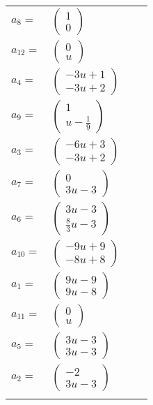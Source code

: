 \documentclass[1p]{elsarticle_modified}
\theoremstyle{definition}
\begin{document}
\begin{tabular}{m{7pt} m{180pt} m{7pt} m{180pt} }
\flushright $a_{8}=$&$\begin{pmatrix}1\\0\end{pmatrix}$ \\
\flushright $a_{12}=$&$\begin{pmatrix}0\\u\end{pmatrix}$ \\
\flushright $a_{4}=$&$\begin{pmatrix}-3 u+1\\-3 u+2\end{pmatrix}$ \\
\flushright $a_{9}=$&$\begin{pmatrix}1\\u-\frac{1}{9}\end{pmatrix}$ \\
\flushright $a_{3}=$&$\begin{pmatrix}-6 u+3\\-3 u+2\end{pmatrix}$ \\
\flushright $a_{7}=$&$\begin{pmatrix}0\\3 u-3\end{pmatrix}$ \\
\flushright $a_{6}=$&$\begin{pmatrix}3 u-3\\\frac{8}{3} u-3\end{pmatrix}$ \\
\flushright $a_{10}=$&$\begin{pmatrix}-9 u+9\\-8 u+8\end{pmatrix}$ \\
\flushright $a_{1}=$&$\begin{pmatrix}9 u-9\\9 u-8\end{pmatrix}$ \\
\flushright $a_{11}=$&$\begin{pmatrix}0\\u\end{pmatrix}$ \\
\flushright $a_{5}=$&$\begin{pmatrix}3 u-3\\3 u-3\end{pmatrix}$ \\
\flushright $a_{2}=$&$\begin{pmatrix}-2\\3 u-3\end{pmatrix}$\\&\end{tabular}
\end{document}
